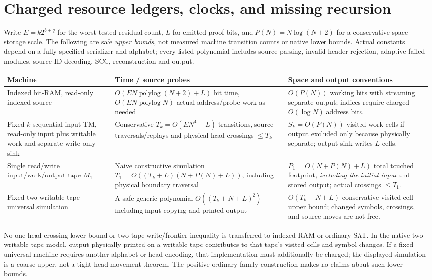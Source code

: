 \documentclass[11pt]{article}
\begin{document}
\section{Charged resource ledgers, clocks, and missing recursion}
Write $E=k2^{b+q}$ for the worst tested residual count, $L$ for emitted proof bits, and $P(N)=N\log(N+2)$ for a conservative space-storage scale. The following are safe \emph{upper bounds}, not measured machine transition counts or native lower bounds. Actual constants depend on a fully specified serializer and alphabet; every listed polynomial includes source parsing, invalid-header rejection, adaptive failed modules, source-ID decoding, SCC, reconstruction and output.
\begin{center}\small
\begin{tabular}{p{.23\linewidth}p{.32\linewidth}p{.33\linewidth}}\toprule
Machine & Time / source probes & Space and output conventions\\\midrule
Indexed bit-RAM, read-only indexed source & $O(EN\operatorname{polylog}(N+2)+L)$ bit time, $O(EN\operatorname{polylog}N)$ actual address/probe work as needed & $O(P(N))$ working bits with streaming separate output; indices require charged $O(\log N)$ address bits.\\[2pt]
Fixed-$k$ sequential-input TM, read-only input plus writable work and separate write-only sink & Conservative $T_k=O(EN^4+L)$ transitions, source traversals/replays and physical head crossings $\le T_k$ & $S_k=O(P(N))$ visited work cells if output excluded only because physically separate; output sink writes $L$ cells.\\[2pt]
Single read/write input/work/output tape $M_1$ & Naive constructive simulation $T_1=O((T_k+L)(N+P(N)+L))$, including physical boundary traversal & $P_1=O(N+P(N)+L)$ total touched footprint, \emph{including the initial input} and stored output; actual crossings $\le T_1$.\\[2pt]
Fixed two-writable-tape universal simulation & A safe generic polynomial $O((T_k+N+L)^2)$ including input copying and printed output & $O(T_k+N+L)$ conservative visited-cell upper bound; changed symbols, crossings, and source moves are not free.\\\bottomrule
\end{tabular}
\end{center}
No one-head crossing lower bound or two-tape write/frontier inequality is transferred to indexed RAM or ordinary SAT. In the native two-writable-tape model, output physically printed on a writable tape contributes to that tape's visited cells and symbol changes. If a fixed universal machine requires another alphabet or head encoding, that implementation must additionally be charged; the displayed simulation is a coarse upper, not a tight head-movement theorem. The positive ordinary-family construction makes no claims about such lower bounds.
\end{document}
